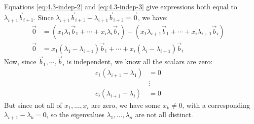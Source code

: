 \documentclass[11pt, letterpaper]{report}
\newenvironment{book}{}{}
\begin{document}
\begin{book}
Equations \ref{eq:4.3-indep-2} and \ref{eq:4.3-indep-3} give expressions both equal to $\lambda_{i+1}\vec{b}_{i+1}$. Since $\lambda_{i+1}\vec{b}_{i+1} - \lambda_{i+1}\vec{b}_{i+1} = \vec{0}$, we have:
\begin{align*}
\vec{0}&=(x_1\lambda_1\vec{b}_1+ \cdots + x_i\lambda_i\vec{b}_i) - ( x_1\lambda_{i+1}\vec{b}_1+ \cdots + x_i\lambda_{i+1}\vec{b}_i ) \\
\vec{0}&= x_{1}(\lambda_1-\lambda_{i+1})\vec{b}_1 + \cdots + x_i(\lambda_i-\lambda_{i+1})\vec{b}_i 
\end{align*}
Now, since $\vec{b}_1,\cdots,\vec{b}_i$ is independent, we know all the scalars are zero:
\begin{align*}
c_1(\lambda_{i+1}-\lambda_1) &= 0 \\
&\vdots \\
c_i(\lambda_{i+1}-\lambda_i) &= 0
\end{align*}
But since not all of $x_1,\ldots,x_i$ are zero, we have some $x_k \ne 0$, with a corresponding $\lambda_{i+1}-\lambda_k=0$, so the eigenvalues $\lambda_1,\ldots,\lambda_n$ are not all distinct. \blacksquare
\end{book}
\end{document}
